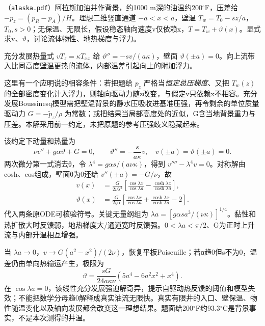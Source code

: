 \begin{exercise}\label{task:fluid-alaska}
（\texttt{alaska.pdf}）阿拉斯加油井作背景，约1000 m深的油温约200$^\circ$F，压差给 $-p_z=(p_R-p_A)/H$。理想二维竖直通道 $-a<x<a$，壁温 $T_w=T_0-sz/a$，$T_0,s>0$；无保温、无限长，假设稳态轴向速度v仅依赖x，$T=T_w+\vartheta(x)$。显式求v、$\vartheta$，讨论流体物性、地热梯度与浮力。
\end{exercise}
\begin{solution}
充分发展热量式 $vT_z=\kappa T_{xx}$ 给 $\vartheta''=-sv/(a\kappa)$，壁面 $\vartheta(\pm a)=0$。向上流带入比同高度壁温更热的流体，内部温差引起向上的附加浮力。

这里有一个应明说的相容条件：若把题给 $p_z$ 严格当\emph{恒定总压梯度}、又把 $T_w(z)$ 的全部密度变化计入浮力，则轴向驱动力随z改变，与假定v只依赖x不相容。充分发展Boussinesq模型需把壁温背景的静水压吸收进基准压强，再令剩余的单位质量驱动力 $G=-\widetilde p_z/\rho$ 为常数；或把结果当局部高度处的近似，G含当地背景重力与压差。本解采用前一约定，未把原题的参考压强歧义隐藏起来。

该约定下动量和热量为
\[
 \nu v''+g\alpha\vartheta+G=0,\qquad
 \vartheta''=-\frac{s}{a\kappa}v,\quad
 v(\pm a)=\vartheta(\pm a)=0.
\]
两次微分第一式消去θ，令 $\lambda^4=g\alpha s/(a\nu\kappa)$，得到 $v''''-\lambda^4v=0$。对称解由cosh、cos组成，壁面θ为0还给 $v''(\pm a)=-G/\nu$，故
\begin{align*}
 v(x)&=\frac{G}{2\nu\lambda^2}
   \left[\frac{\cos\lambda x}{\cos\lambda a}
        -\frac{\cosh\lambda x}{\cosh\lambda a}\right],\\
 \vartheta(x)&=\frac{G}{2g\alpha}
   \left[\frac{\cos\lambda x}{\cos\lambda a}
        +\frac{\cosh\lambda x}{\cosh\lambda a}-2\right].
\end{align*}
代入两条原ODE可核验符号。关键无量纲组为 $\lambda a=[g\alpha s a^3/(\nu\kappa)]^{1/4}$。黏性和热扩散大时反馈弱，地热梯度大/通道宽时反馈强。$0<\lambda a<\pi/2$、G为正时上升流与内部升温相互增强。

当 $\lambda a\to0$，$v\to G(a^2-x^2)/(2\nu)$，恢复平板Poiseuille；若α趋0但s不为0，温差仍由单向热输运产生，极限为
\[
 \vartheta=\frac{sG}{24a\kappa\nu}(5a^4-6a^2x^2+x^4).
\]
在 $\cos\lambda a=0$，该线性充分发展强迫解奇异，提示自驱动热反馈的阈值和模型失效；不能把数学分母趋0解释成真实油流无限快。真实有限井的入口、壁保温、物性随温变化以及轴向发展都会改变这一理想结果。题面给200$^\circ$F约93.3$^\circ$C是背景事实，不是本次测得的井温。
\end{solution}

